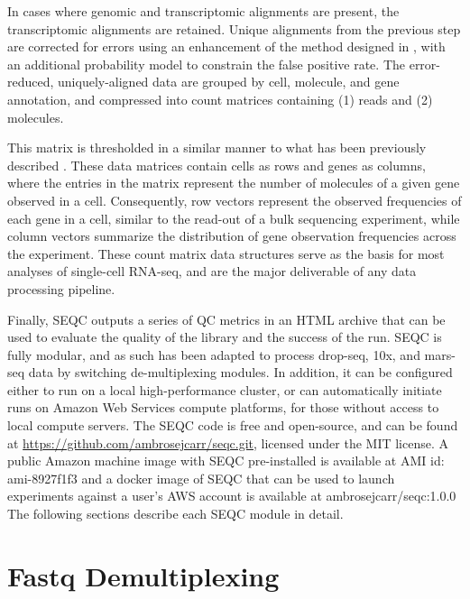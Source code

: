 In cases where genomic and transcriptomic alignments are present, the transcriptomic alignments are retained. 
Unique alignments from the previous step are corrected for errors using an enhancement of the method designed in \cite{Jaitin2014}, with an additional probability model to constrain the false positive rate.
The error-reduced, uniquely-aligned data are grouped by cell, molecule, and gene annotation, and compressed into count matrices containing (1) reads and (2) molecules. 

This matrix is thresholded in a similar manner to what has been previously described \citep{Macosko2015,Zheng2017a}. 
These data matrices contain cells as rows and genes as columns, where the entries in the matrix represent the number of molecules of a given gene observed in a cell. 
Consequently, row vectors represent the observed frequencies of each gene in a cell, similar to the read-out of a bulk sequencing experiment, while column vectors summarize the distribution of gene observation frequencies across the experiment. 
These count matrix data structures serve as the basis for most analyses of single-cell RNA-seq, and are the major deliverable of any data processing pipeline. 

Finally, SEQC outputs a series of QC metrics in an HTML archive that can be used to evaluate the quality of the library and the success of the run. 
SEQC is fully modular, and as such has been adapted to process drop-seq, 10x, and mars-seq data by switching de-multiplexing modules.  
In addition, it can be configured either to run on a local high-performance cluster, or can automatically initiate runs on Amazon Web Services compute platforms, for those without access to local compute servers. 
The SEQC code is free and open-source, and can be found at \href{https://github.com/ambrosejcarr/seqc.git}{https://github.com/ambrosejcarr/seqc.git}, licensed under the MIT license. 
A public Amazon machine image with SEQC pre-installed is available at AMI id: {\mono ami-8927f1f3} and a docker image of SEQC that can be used to launch experiments against a user's AWS account is available at {\mono ambrosejcarr/seqc:1.0.0}
The following sections describe each SEQC module in detail. 

\section{Fastq Demultiplexing}

